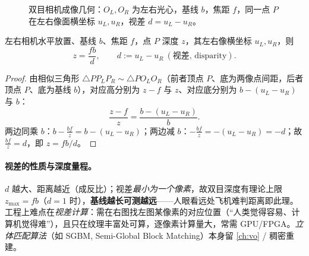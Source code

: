 \begin{figure}[ht]
\centering
{}
\caption{双目相机成像几何：$O_L,O_R$ 为左右光心，基线 $b$，焦距 $f$，同一点 $P$ 在左右像面横坐标 $u_L,u_R$，视差 $d=u_L-u_R$。}
\label{fig:cam-stereo}
\end{figure}

\begin{theorem}[双目深度]\label{thm:stereo}
左右相机水平放置、基线 $b$、焦距 $f$，点 $P$ 深度 $z$，其左右像横坐标 $u_L,u_R$，则
\begin{equation}
  z=\frac{fb}{d},\qquad d:=u_L-u_R\ (\text{视差,\ disparity}).
  \label{eq:stereo}
\end{equation}
\end{theorem}
\begin{proof}
由相似三角形 $\triangle PP_LP_R\sim\triangle PO_LO_R$（前者顶点 $P$、底为两像点间距，后者顶点 $P$、底为基线 $b$），对应高分别为 $z-f$ 与 $z$、对应底分别为 $b-(u_L-u_R)$ 与 $b$：
\[
  \frac{z-f}{z}=\frac{b-(u_L-u_R)}{b}.
\]
两边同乘 $b$：$b-\tfrac{bf}{z}=b-(u_L-u_R)$；两边减 $b$：$-\tfrac{bf}{z}=-(u_L-u_R)=-d$；故 $\tfrac{bf}{z}=d$，即 $z=fb/d$。
\end{proof}

\paragraph{视差的性质与深度量程。}
$d$ 越大、距离越近（成反比）\cite{gaoxiang2019slam14}；视差\emph{最小为一个像素}，故双目深度有理论上限 $z_{\max}=fb$（$d=1$ 时），\textbf{基线越长可测越远}——人眼看远处飞机难判距离即此理。工程上难点在\emph{视差计算}：需在右图找左图某像素的对应位置（“人类觉得容易、计算机觉得难”），且只在纹理丰富处可算，逐像素计算量大，常需 GPU/FPGA。\emph{立体匹配算法}（如 SGBM, Semi-Global Block Matching）本身留 \cref{ch:vo} / 稠密重建。

